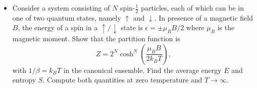 \begin{Problem}
\begin{itemize}
    \item Consider a system consisting of \(N\) spin-\(\frac{1}{2}\) particles, each of which can be in one of two quantum states, namely \( \uparrow \) and \( \downarrow \). In presence of a magnetic field \(B\), the energy of a spin in a \( \uparrow / \downarrow\) state is \( \epsilon = \pm\mu_B B / 2 \) where \( \mu_B \) is the magnetic moment. Show that the partition function is
    \[
    Z = 2^N \cosh^N \left( \frac{\mu_B B}{2 k_B T} \right),
    \]
    with \( 1/\beta = k_B T \) in the canonical ensemble. Find the average energy \( E \) and entropy \( S \). Compute both quantities at zero temperature and \( T \to \infty \).
\end{itemize}
\end{Problem}
